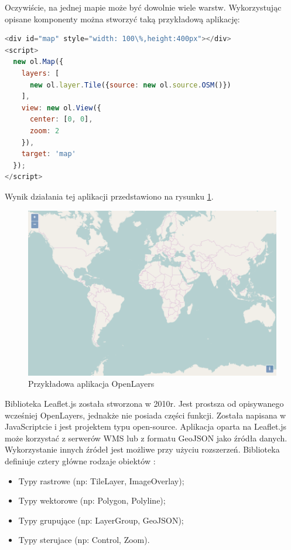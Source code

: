 Oczywiście, na jednej mapie może być dowolnie wiele warstw. Wykorzystując opisane komponenty można stworzyć taką przykładową aplikację:

\begin{lstlisting}[frame=L, language=JavaScript]
<div id="map" style="width: 100\%,height:400px"></div>
<script>
  new ol.Map({
    layers: [
      new ol.layer.Tile({source: new ol.source.OSM()})
    ],
    view: new ol.View({
      center: [0, 0],
      zoom: 2
    }),
    target: 'map'
  });
</script>
\end{lstlisting}

Wynik działania tej aplikacji przedstawiono na rysunku \ref{fig:openlayers_example}.

\begin{figure}[h!]
    \centering
    \includegraphics[width=1.0\textwidth]{img/openlayers_example.png}
    \caption{Przykładowa aplikacja OpenLayers}
    \label{fig:openlayers_example}
\end{figure}

Biblioteka Leaflet.js została stworzona w 2010r. Jest prostsza od opisywanego wcześniej OpenLayers, jednakże nie posiada części funkcji.
Została napisana w JavaScriptcie i jest projektem typu open-source.
Aplikacja oparta na Leaflet.js może korzystać z serwerów WMS lub z formatu GeoJSON jako źródła danych. Wykorzystanie innych źródeł jest możliwe
przy użyciu rozszerzeń. Biblioteka definiuje cztery główne rodzaje obiektów \cite{website:LeafletDocumentation}:
\begin{itemize}
    \item Typy rastrowe (np: TileLayer, ImageOverlay);
    \item Typy wektorowe (np: Polygon, Polyline);
    \item Typy grupujące (np: LayerGroup, GeoJSON);
    \item Typy sterujace (np: Control, Zoom).
\end{itemize}

